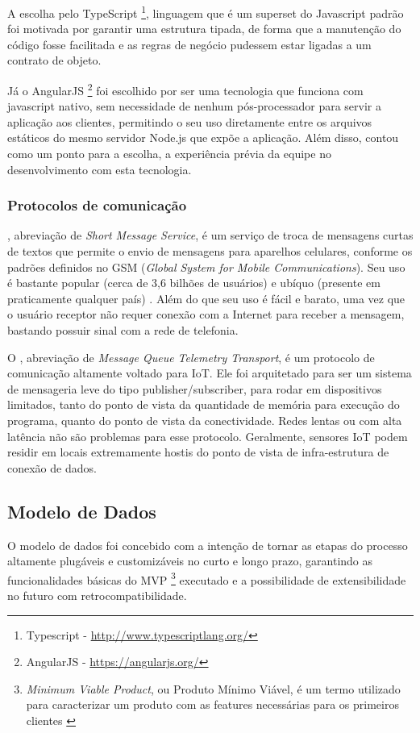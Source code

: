 A escolha pelo TypeScript \footnote{Typescript - \url{http://www.typescriptlang.org/}}, linguagem que é um superset do Javascript padrão foi motivada por garantir uma estrutura tipada, de forma que a manutenção do código fosse facilitada e as regras de negócio pudessem estar ligadas a um contrato de objeto.

Já o AngularJS \footnote{AngularJS - \url{https://angularjs.org/}} foi escolhido por ser uma tecnologia que funciona com javascript nativo, sem necessidade de nenhum pós-processador para servir a aplicação aos clientes, permitindo o seu uso diretamente entre os arquivos estáticos do mesmo servidor Node.js que expõe a aplicação. Além disso, contou como um ponto para a escolha, a experiência prévia da equipe no desenvolvimento com esta tecnologia.

\subsubsection{Protocolos de comunicação}
\label{protocolos}

\label{sms}, abreviação de \textit{Short Message Service}, é um serviço de troca de mensagens curtas de textos que permite o envio de mensagens para aparelhos celulares, conforme os padrões definidos no GSM (\textit{Global System for Mobile Communications}). Seu uso é bastante popular (cerca de 3,6 bilhões de usuários) \cite{SMS} e ubíquo (presente em praticamente qualquer país) \cite{SMSItu}. Além do que seu uso é fácil e barato, uma vez que o usuário receptor não requer conexão com a Internet para receber a mensagem, bastando possuir sinal com a rede de telefonia.

O \label{mqtt}, abreviação de \textit{Message Queue Telemetry Transport}, é um protocolo de comunicação altamente voltado para IoT. Ele foi arquitetado para ser um sistema de mensageria leve do tipo publisher/subscriber, para rodar em dispositivos limitados, tanto do ponto de vista da quantidade de memória para execução do programa, quanto do ponto de vista da conectividade. Redes lentas ou com alta latência não são problemas para esse protocolo. Geralmente, sensores IoT podem residir em locais extremamente hostis do ponto de vista de infra-estrutura de conexão de dados.

\subsection{Modelo de Dados}
O modelo de dados foi concebido com a intenção de tornar as etapas do processo altamente plugáveis e customizáveis no curto e longo prazo, garantindo as funcionalidades básicas do MVP \footnote{\textit{Minimum Viable Product}, ou Produto Mínimo Viável, é um termo utilizado para caracterizar um produto com as features necessárias para os primeiros clientes \cite{MVP}} executado e a possibilidade de extensibilidade no futuro com retrocompatibilidade. 

